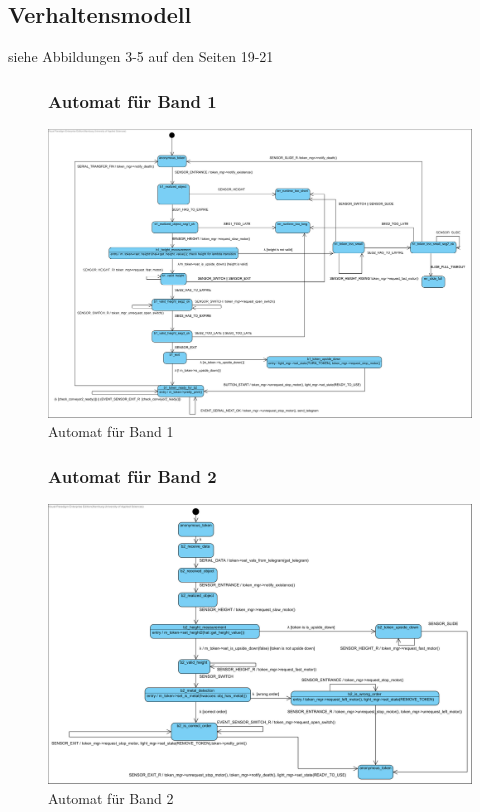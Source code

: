 \documentclass[oneside,a4paper,titlepage]{scrartcl}              %
\begin{document}
\subsection{Verhaltensmodell}
siehe Abbildungen 3-5 auf den Seiten 19-21

\begin{figure}[p]
  \subsubsection{Automat für Band 1}
  \centering\includegraphics[angle=90,scale=0.62]{imgs/Band1_FSM.png}
  \caption{Automat für Band 1}
\end{figure}

\begin{figure}[p]
  \subsubsection{Automat für Band 2}
  \centering\includegraphics[angle=90,scale=0.77]{imgs/Band2_FSM.png}
  \caption{Automat für Band 2}
  \clearpage
\end{figure}
\end{document}
